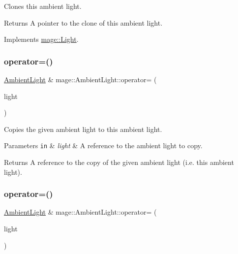 Clones this ambient light.

\begin{DoxyReturn}{Returns}
A pointer to the clone of this ambient light. 
\end{DoxyReturn}


Implements \hyperlink{classmage_1_1_light_aa613d76a1ebda69efde853d15f75490c}{mage\+::\+Light}.

\hypertarget{classmage_1_1_ambient_light_aa8bbeaca08a626b6b5f5447a847724cc}{}\label{classmage_1_1_ambient_light_aa8bbeaca08a626b6b5f5447a847724cc} 
\subsubsection{\texorpdfstring{operator=()}{operator=()}\hspace{0.1cm}{\footnotesize\ttfamily [1/2]}}
{\footnotesize\ttfamily \hyperlink{classmage_1_1_ambient_light}{Ambient\+Light} \& mage\+::\+Ambient\+Light\+::operator= (\begin{DoxyParamCaption}\item[{const \hyperlink{classmage_1_1_ambient_light}{Ambient\+Light} \&}]{light }\end{DoxyParamCaption})\hspace{0.3cm}{\ttfamily [default]}}

Copies the given ambient light to this ambient light.


\begin{DoxyParams}[1]{Parameters}
\mbox{\tt in}  & {\em light} & A reference to the ambient light to copy. \\
\hline
\end{DoxyParams}
\begin{DoxyReturn}{Returns}
A reference to the copy of the given ambient light (i.\+e. this ambient light). 
\end{DoxyReturn}
\hypertarget{classmage_1_1_ambient_light_ae54bf8695957fb438e162a913725922a}{}\label{classmage_1_1_ambient_light_ae54bf8695957fb438e162a913725922a} 
\subsubsection{\texorpdfstring{operator=()}{operator=()}\hspace{0.1cm}{\footnotesize\ttfamily [2/2]}}
{\footnotesize\ttfamily \hyperlink{classmage_1_1_ambient_light}{Ambient\+Light} \& mage\+::\+Ambient\+Light\+::operator= (\begin{DoxyParamCaption}\item[{\hyperlink{classmage_1_1_ambient_light}{Ambient\+Light} \&\&}]{light }\end{DoxyParamCaption})\hspace{0.3cm}{\ttfamily [default]}}

